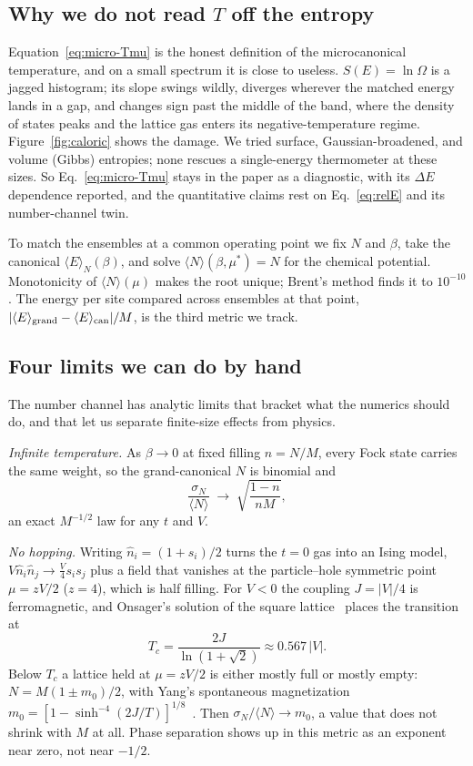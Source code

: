 \documentclass[twocolumn,10pt]{article}
\newcommand{\avg}[1]{\langle #1 \rangle}
\begin{document}
\subsection{Why we do not read $T$ off the entropy}
Equation~\eqref{eq:micro-Tmu} is the honest definition of the microcanonical
temperature, and on a small spectrum it is close to useless. $S(E)=\ln\Omega$ is
a jagged histogram; its slope swings wildly, diverges wherever the matched energy
lands in a gap, and changes sign past the middle of the band, where the density
of states peaks and the lattice gas enters its negative-temperature regime.
Figure~\ref{fig:caloric} shows the damage. We tried surface, Gaussian-broadened,
and volume (Gibbs) entropies; none rescues a single-energy thermometer at these
sizes. So Eq.~\eqref{eq:micro-Tmu} stays in the paper as a diagnostic, with its
$\Delta E$ dependence reported, and the quantitative claims rest on
Eq.~\eqref{eq:relE} and its number-channel twin.

To match the ensembles at a common operating point we fix $N$ and $\beta$, take
the canonical $\avg E_N(\beta)$, and solve $\avg N(\beta,\mu^\ast)=N$ for the
chemical potential. Monotonicity of $\avg N(\mu)$ makes the root unique; Brent's
method finds it to $10^{-10}$. The energy per site compared across ensembles at
that point, $|\avg E_{\rm grand}-\avg E_{\rm can}|/M$, is the third metric we
track.

\subsection{Four limits we can do by hand}\label{sec:limits}
The number channel has analytic limits that bracket what the numerics should do,
and that let us separate finite-size effects from physics.

\emph{Infinite temperature.} As $\beta\to0$ at fixed filling $n=N/M$, every Fock
state carries the same weight, so the grand-canonical $N$ is binomial and
\begin{equation}
\frac{\sigma_N}{\avg N}\;\to\;\sqrt{\frac{1-n}{nM}},
\label{eq:binomial}
\end{equation}
an exact $M^{-1/2}$ law for any $t$ and $V$.

\emph{No hopping.} Writing $\hat n_i=(1+s_i)/2$ turns the $t=0$ gas into an Ising
model, $V\hat n_i\hat n_j\to\tfrac V4 s_is_j$ plus a field that vanishes at the
particle--hole symmetric point $\mu=zV/2$ ($z=4$), which is half filling. For
$V<0$ the coupling $J=|V|/4$ is ferromagnetic, and Onsager's solution of the
square lattice~\cite{onsager} places the transition at
\begin{equation}
T_c=\frac{2J}{\ln(1+\sqrt2)}\approx0.567\,|V| .
\label{eq:tc}
\end{equation}
Below $T_c$ a lattice held at $\mu=zV/2$ is either mostly full or mostly empty:
$N=M(1\pm m_0)/2$, with Yang's spontaneous magnetization
$m_0=[1-\sinh^{-4}(2J/T)]^{1/8}$~\cite{yang}. Then $\sigma_N/\avg N\to m_0$, a
value that does not shrink with $M$ at all. Phase separation shows up in this
metric as an exponent near zero, not near $-1/2$.
\end{document}
